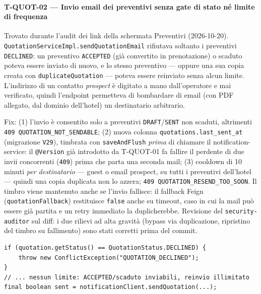 ﻿\documentclass[a4paper,12pt]{report}
\begin{document}
\paragraph{T-QUOT-02 --- Invio email dei preventivi senza gate di stato né limite di frequenza}
Trovato durante l'audit dei link della schermata Preventivi (2026-10-20).
\texttt{QuotationServiceImpl.sendQuotationEmail} rifiutava soltanto i
preventivi \texttt{DECLINED}: un preventivo \texttt{ACCEPTED} (già convertito
in prenotazione) o scaduto poteva essere inviato di nuovo, e lo stesso
preventivo --- oppure una sua copia creata con \texttt{duplicateQuotation} ---
poteva essere reinviato senza alcun limite. L'indirizzo di un contatto
\emph{prospect} è digitato a mano dall'operatore e mai verificato, quindi
l'endpoint permetteva di bombardare di email (con PDF allegato, dal dominio
dell'hotel) un destinatario arbitrario.

Fix: (1) l'invio è consentito solo a preventivi \texttt{DRAFT}/\texttt{SENT}
non scaduti, altrimenti \texttt{409 QUOTATION\_NOT\_SENDABLE}; (2) nuova colonna
\texttt{quotations.last\_sent\_at} (migrazione \texttt{V29}), timbrata con
\texttt{saveAndFlush} \emph{prima} di chiamare il notification-service:
il \texttt{@Version} già introdotto da T-QUOT-01 fa fallire il perdente di due
invii concorrenti (\texttt{409}) prima che parta una seconda mail;
(3) cooldown di 10 minuti \emph{per destinatario} --- guest o email prospect,
su tutti i preventivi dell'hotel --- quindi una copia duplicata non lo
azzera; \texttt{409 QUOTATION\_RESEND\_TOO\_SOON}. Il timbro viene mantenuto
anche se l'invio fallisce: il fallback Feign (\texttt{quotationFallback})
restituisce \texttt{false} anche su timeout, caso in cui la mail può essere
già partita e un retry immediato la duplicherebbe. Revisione del
\texttt{security-auditor} sul diff: i due rilievi ad alta gravità (bypass via
duplicazione, ripristino del timbro su fallimento) sono stati corretti prima
del commit.

\begin{insecurebox}[title={QuotationServiceImpl.java --- solo DECLINED bloccato (baseline)}]
\begin{lstlisting}[style=java]
if (quotation.getStatus() == QuotationStatus.DECLINED) {
    throw new ConflictException("QUOTATION_DECLINED");
}
// ... nessun limite: ACCEPTED/scaduto inviabili, reinvio illimitato
final boolean sent = notificationClient.sendQuotation(...);
\end{lstlisting}
\end{insecurebox}
\end{document}
